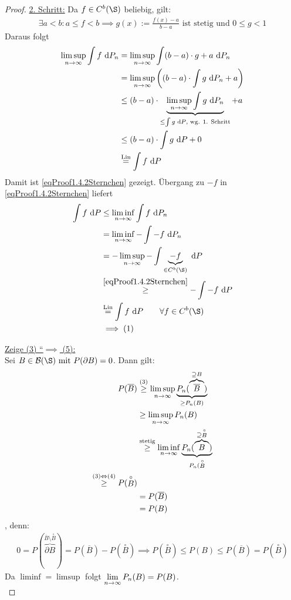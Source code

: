 \begin{proof}
\ul{2. Schritt:} Da $f\in C^b(\S)$ beliebig, gilt:
\begin{align*}
\exists a<b:a\leq f<b
\implies g(x):=\frac{f(x)-a}{b-a}\text{ ist stetig und } 0\leq g<1
\end{align*}
Daraus folgt
\begin{align*}
\limsup\limits_{n\to\infty}\int\limits f\text{ d} P_n
&=\limsup\limits_{n\to\infty}\int\limits (b-a)\cdot g+a\text{ d} P_n\\
&=\limsup\limits_{n\to\infty}\left((b-a)\cdot\int\limits g\text{ d} P_n+a\right)\\
&\leq(b-a)\cdot\underbrace{\limsup\limits_{n\to\infty}\int\limits g\text{ d} P_n}_{\leq\int\limits g\text{ d} P\text{, wg. 1. Schritt}}+a\\
&\leq(b-a)\cdot\int\limits g\text{ d} P+0\\
&\stackrel{\text{Lin}}{=}
\int\limits f\text{ d} P
\end{align*}
Damit ist \eqref{eqProof1.4.2Sternchen} gezeigt. Übergang zu $-f$ in \eqref{eqProof1.4.2Sternchen} liefert
\begin{align*}
\int\limits f\d P
&\leq
\liminf\limits_{n\to\infty}\int\limits f\d P_n\\
&=\liminf\limits_{n\to\infty}-\int\limits -f\d P_n\\
&=-\limsup\limits_{n\to\infty}-\int\limits \underbrace{-f}_{\in C^b(\S)}\d P\\
&\stackrel{\eqref{eqProof1.4.2Sternchen}}{\geq}
-\int\limits -f\d P\\
&\stackeq{\text{Lin}}
\int\limits f\d P
\qquad\forall f\in C^b(\S)\\
&\implies(1)
\end{align*}

\underline{Zeige (3) ``$\implies$ (5):}\\
Sei $B\in\B(\S)\mit P(\partial B)=0$. Dann gilt:
\begin{align*}
P(\overline{B})
&\stackrel{(3)}{\geq}
\limsup\limits_{n\to\infty} \underbrace{P_n(\overbrace{\overline{B}}^{\supseteq B})}_{\geq P_n(B)}\\
&\geq\limsup\limits_{n\to\infty} P_n(B)\\
&\stackrel{\text{stetig}}{\geq}
\liminf\limits_{n\to\infty} \underbrace{P_n(\overbrace{B}^{\supseteq\stackrel{\circ}{B}})}_{P_n(\stackrel{\circ}{B}}\\
\stackrel{(3)\Leftrightarrow(4)}{\geq}
P(\stackrel{\circ}{B})\\
&=P(\overline{B})\\
&=P(B)
\end{align*}, denn:
\begin{align}\label{eqProof1.4.2SternchenZwei}
0
=P(\overbrace{\partial B}^{\overline{B}\setminus\stackrel{\circ}{B}}
)=P(\overline{B})-P(\stackrel{\circ}{B})
\implies
P(\stackrel{\circ}{B})\leq P(B)\leq P(\overline{B})=P(\stackrel{\circ}{B})
\end{align}
Da $\liminf=\limsup$ folgt $\lim\limits_{n\to\infty} P_n(B)=P(B)$.\\


\end{proof}
